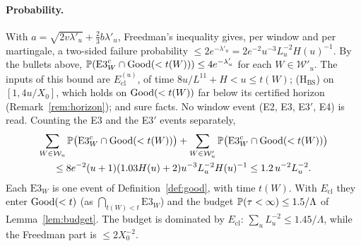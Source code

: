 \paragraph{Probability.} With $a=\sqrt{2v\lambda'_u}+\frac23b\lambda'_u$, Freedman's inequality gives, per window and per
martingale, a two-sided failure probability $\le2e^{-\lambda'_u}=2e^{-2}u^{-3}L_u^{-2}H(u)^{-1}$. By the bullets above,
$\mathbb{P}(\mathrm{E3}_W^c\cap\mathrm{Good}(<t(W)))\le4e^{-\lambda'_u}$ for each $W\in\mathcal W'_u$. The inputs of this bound are $E_{\mathrm{cl}}^{(u)}$, of time $8u/L^{11}+H<u\le t(W)$; \textup{(H$_{\mathrm{BS}}$)} on $[1,4u/X_0]$, which holds on
$\mathrm{Good}(<t(W))$ far below its certified horizon (Remark~\ref{rem:horizon}); and sure facts. No window event (E2, E3, E3$'$, E4) is read. Counting the E3 and the E3$'$ events separately,
\begin{multline*}
  \sum_{W\in\mathcal W_u}\mathbb{P}\big(\mathrm{E3}_W^c\cap\mathrm{Good}(<t(W))\big)+\sum_{W\in\mathcal W'_u}\mathbb{P}\big(\mathrm{E3}_W^c\cap\mathrm{Good}(<t(W))\big)\\
  \le8e^{-2}(u+1)(1.03H(u)+2)u^{-3}L_u^{-2}H(u)^{-1}\le1.2\,u^{-2}L_u^{-2}.
\end{multline*}
Each $\mathrm{E3}_W$ is one event of Definition~\ref{def:good}, with time $t(W)$. With $E_{\mathrm{cl}}$ they enter $\mathrm{Good}(<t)$ (as
$\bigcap_{t(W)<t}\mathrm{E3}_W$) and the budget $\mathbb{P}(\tau<\infty)\le1.5/\Lambda$ of Lemma~\ref{lem:budget}. The budget is dominated by $E_{\mathrm{cl}}$: $\sum_uL_u^{-2}\le1.45/\Lambda$, while the
Freedman part is $\le2X_0^{-2}$.

